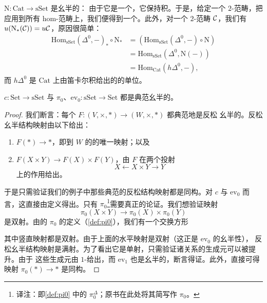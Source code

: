 \begin{example*}
\trNerve{}\trFunctor{} $\mathrm{N}\colon \mathrm{Cat} \to \mathrm{sSet}$ 是幺半的：
由于它是一个\trRightAdjoint{}，它保持积。于是，给定一个 $2$-范畴，把\trNerve{}\trFunctor{}%
应用到所有 hom-范畴上，我们便得到一个\trSimplicialCategory{}。此外，对一个 $2$-范畴
$\mathcal{C}$，我们有 $u(\mathrm{N}_*(\mathcal{C})) = u\mathcal{C}$，原因很简单：
\[
\begin{aligned}
\mathrm{Hom}_{\mathrm{sSet}}(\Delta^0, -)_* \circ \mathrm{N}_*
&= (\mathrm{Hom}_{\mathrm{sSet}}(\Delta^0, -) \circ \mathrm{N})\\
&= \mathrm{Hom}_{\mathrm{sSet}}(\Delta^0, \mathrm{N}(-))\\
&= \mathrm{Hom}_{\mathrm{Cat}}(h\Delta^0, -),
\end{aligned}
\]
而 $h\Delta^0$ 是 $\mathrm{Cat}$ 上由笛卡尔积给出的\trMonoidalStructure{}的单位。
\end{example*}

\begin{lemma}\label{lem:canonically-monoidal}
\trFunctor{} $c\colon \mathrm{Set} \to \mathrm{sSet}$ 与
$\pi_0$、$\mathrm{ev}_0\colon \mathrm{sSet} \to \mathrm{Set}$ 都是典范幺半的。
\end{lemma}

\begin{proof}
我们断言：每个\trFunctor{} $F\colon (V, \times, *) \to (W, \times, *)$ 都典范地是反松
幺半的。反松幺半结构映射由以下给出：
\begin{enumerate}[label=\arabic*.]
  \item $F(*) \to *$，即到 $W$ 的\trTerminalObject{}的唯一映射；以及
  \item $F(X \times Y) \to F(X) \times F(Y)$，由 $F$ 在两个投射
  \[
  X \leftarrow X \times Y \rightarrow Y
  \]
  上的作用给出。
\end{enumerate}
于是只需验证我们的例子中那些典范的反松结构映射都是同构。对 $c$ 与 $\mathrm{ev}_0$
而言，这直接由定义得出。只有\trFunctor{} $\pi_0$\footnote{译注：即\cref{def:pi0} 中的
$\pi^{\Delta}_0$；原书在此处将其简写作 $\pi_0$。}需要真正的论证。我们想验证映射
\[
\pi_0(X \times Y) \to \pi_0(X) \times \pi_0(Y)
\]
是双射。由\trSimplicialSet{}的 $\pi_0$ 的定义（\cref{def:pi0}），我们有一个交换方形
\begin{center}
\end{center}
其中竖直映射都是双射。由于上面的水平映射是双射（这正是 $\mathrm{ev}_0$ 的幺半性），
反松幺半结构映射是满射。为了看出它是单射，只需验证诸关系的生成元可以被提升。由于
这些生成元由 $1$-\trSimplex{}给出，而 $\mathrm{ev}_1$ 也是幺半的，断言得证。此外，直接可得
映射 $\pi_0(*) \to *$ 是同构。
\end{proof}

